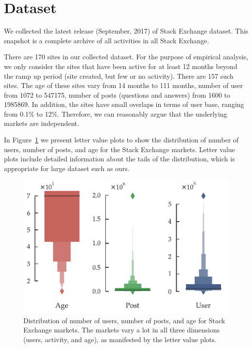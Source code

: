 \section{Dataset} 
We collected the latest release (September, 2017) of Stack Exchange dataset. This snapshot is a complete archive of all activities in all Stack Exchange. 

There are 170 sites in our collected dataset. For the purpose of empirical analysis, we only consider the sites that have been active for at least 12 months beyond the ramp up period (site created, but few or no activity). There are 157 such sites. The age of these sites vary from 14 months to 111 months, number of user from 1072 to 547175, number of posts (questions and answers) from 1600 to 1985869. In addition, the sites have small overlaps in terms of user base, ranging from 0.1\% to 12\%. Therefore, we can reasonably argue that the underlying markets are independent. 

In Figure~\ref{fig:dataset} we present letter value plots to show the distribution of number of users, number of posts, and age for the Stack Exchange markets. Letter value plots include detailed information about the tails of the distribution, which is appropriate for large dataset such as ours. 

\begin{figure}[hbt]
\centering
\includegraphics[scale=0.45]{Figures/Dataset_Statistics.pdf}
\caption{Distribution of number of users, number of posts, and age for Stack Exchange markets. The markets vary a lot in all three dimensions (users, activity, and age), as manifested by the letter value plots. }
\label{fig:dataset}
\end{figure}
